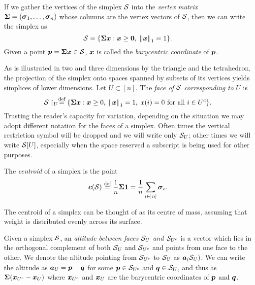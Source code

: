 If we gather the vertices of the simplex $\mathcal{S}$ into the \emph{vertex matrix} $\boldsymbol{\Sigma}=(\vb*{\sigma}_1,\dots,\vb*{\sigma}_n)$ whose columns are the vertex vectors of $\mathcal{S}$, then we can write the simplex as 
\begin{equation*}
    \mathcal{S} = \{\boldsymbol{\Sigma} \vb*{x}:\vb*{x}\geq \vb{0}, \; \norm{\vb*{x}}_1=1\}.
\end{equation*}
Given a point $\vb*{p}=\boldsymbol{\Sigma}\vb*{x}\in\mathcal{S}$, $\vb*{x}$ is called the \emph{barycentric coordinate} of $\vb*{p}$.  

As is illustrated in two and three dimensions by the triangle and the tetrahedron, the projection of the simplex onto spaces spanned by subsets of its vertices yields simplices of lower dimensions. Let $U\subset [n]$. The \emph{face of $\mathcal{S}$ corresponding to $U$} is 
\begin{equation*}
    \mathcal{S}\restriction_U \overset{\text{def}}{=} \{\boldsymbol{\Sigma}\vb*{x}: \vb*{x}\geq 0,\;\norm{\vb*{x}}_1=1,\;x(i)=0\text{ for all }i\in U^c\}.
\end{equation*}
Trusting the reader's capacity for variation, depending on the situation we may adopt different notation for the faces of a simplex. Often times the vertical restriction symbol will be dropped and we will write only $\mathcal{S}_U$; other times we will write $\mathcal{S}[U]$, especially when the space reserved a subscript is being used for other purposes. 

The \emph{centroid} of a simplex is the point 
\begin{equation*}
\vb*{c}(\mathcal{S}) \overset{\text{def}}{=} \frac{1}{n}\boldsymbol{\Sigma} \vb{1} = \frac{1}{n}\sum_{i\in[n]}\vb*{\sigma}_i.
\end{equation*} 

The centroid of a simplex can be thought of as its centre of mass, assuming that weight is distributed evenly across its surface. 

Given a simplex $\mathcal{S}$, an \emph{altitude between faces $\mathcal{S}_U$ and $\mathcal{S}_{U^c}$} is a vector which lies in the orthogonal complement of both $\mathcal{S}_U$ and $\mathcal{S}_{U^c}$ and points from one face to the other. 
We denote the altitude pointing from $\mathcal{S}_{U^c}$ to $\mathcal{S}_{U}$ as $\vb*{a}_(\mathcal{S}_U)$. We can write the altitude as $\vb*{a}_U=\vb*{p}-\vb*{q}$ for some $\vb*{p}\in \mathcal{S}_{U^c}$ and $\vb*{q}\in\mathcal{S}_{U}$, and thus as $\boldsymbol{\Sigma}(\vb*{x}_{U^c}-\vb*{x}_{U})$ where $\vb*{x}_{U^c}$ and $\vb*{x}_{U}$ are the barycentric coordinates of $\vb*{p}$ and $\vb*{q}$. 






